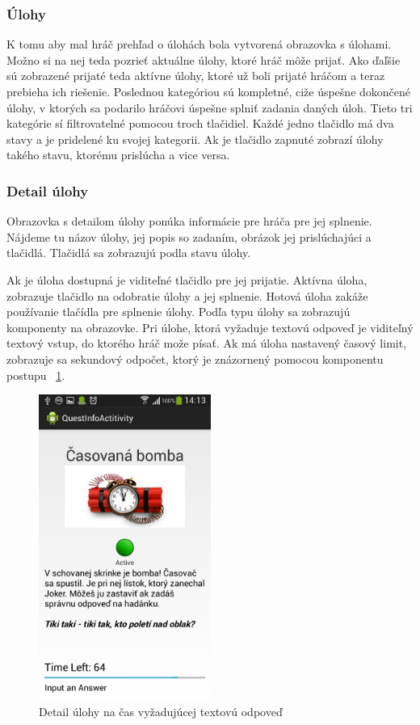 \subsubsection{Úlohy}
K tomu aby mal hráč prehľad o úlohách bola vytvorená obrazovka s úlohami. Možno si na nej teda pozrieť aktuálne úlohy, ktoré hráč môže prijať. Ako ďaľšie sú zobrazené prijaté teda aktívne úlohy, ktoré už boli prijaté hráčom a teraz prebieha ich riešenie. Poslednou kategóriou sú kompletné, ciže úspešne dokončené úlohy, v ktorých sa podarilo hráčovi úspešne splniť zadania daných úloh. Tieto tri kategórie sí filtrovatelné pomocou troch tlačidiel. Každé jedno tlačidlo má dva stavy a je pridelené ku svojej kategorii. Ak je tlačidlo zapnuté zobrazí úlohy takého stavu, ktorému prislúcha a vice versa.

\subsubsection{Detail úlohy}
Obrazovka s detailom úlohy ponúka informácie pre hráča pre jej splnenie. Nájdeme tu názov úlohy, jej popis so zadaním, obrázok jej prislúchajúci a tlačidlá. Tlačidlá sa zobrazujú podla stavu úlohy. 

Ak je úloha dostupná je viditeľné tlačidlo pre jej prijatie. 
Aktívna úloha, zobrazuje tlačidlo na odobratie úlohy a jej splnenie. Hotová úloha zakáže používanie tlačídla pre splnenie úlohy. Podľa typu úlohy sa zobrazujú komponenty na obrazovke. Pri úlohe, ktorá vyžaduje textovú odpoveď je viditeľný textový vstup, do ktorého hráč može písať. Ak má úloha nastavený časový limit, zobrazuje sa sekundový odpočet, ktorý je znázornený pomocou komponentu postupu ~\ref{fig:klient_deatilUlohy}.
\begin{figure}[h]
  \centering
  \includegraphics[height=10cm]{mainmatter/imgs/klient_questrunning.png}
  \caption{Detail úlohy na čas vyžadujúcej textovú odpoveď}
  \label{fig:klient_deatilUlohy}
\end{figure}

